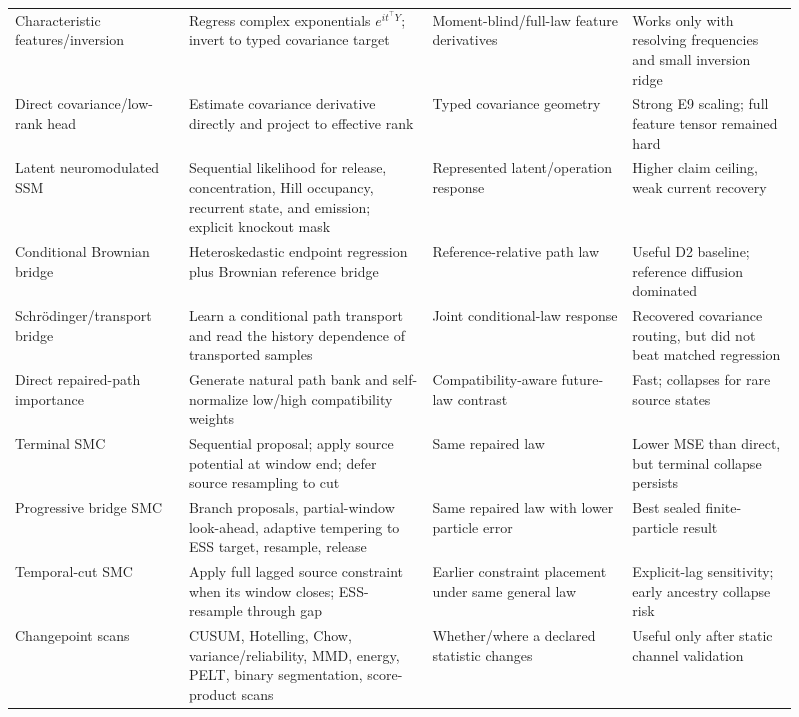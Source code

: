 \documentclass[10pt]{article}
\begin{document}
\begin{longtable}{L{0.20\linewidth}L{0.29\linewidth}L{0.23\linewidth}L{0.19\linewidth}}
Characteristic features/inversion & Regress complex exponentials $e^{it^\top Y}$; invert to typed covariance target & Moment-blind/full-law feature derivatives & Works only with resolving frequencies and small inversion ridge \\
Direct covariance/low-rank head & Estimate covariance derivative directly and project to effective rank & Typed covariance geometry & Strong E9 scaling; full feature tensor remained hard \\
Latent neuromodulated SSM & Sequential likelihood for release, concentration, Hill occupancy, recurrent state, and emission; explicit knockout mask & Represented latent/operation response & Higher claim ceiling, weak current recovery \\
Conditional Brownian bridge & Heteroskedastic endpoint regression plus Brownian reference bridge & Reference-relative path law & Useful D2 baseline; reference diffusion dominated \\
Schr\"odinger/transport bridge & Learn a conditional path transport and read the history dependence of transported samples & Joint conditional-law response & Recovered covariance routing, but did not beat matched regression \\
Direct repaired-path importance & Generate natural path bank and self-normalize low/high compatibility weights & Compatibility-aware future-law contrast & Fast; collapses for rare source states \\
Terminal SMC & Sequential proposal; apply source potential at window end; defer source resampling to cut & Same repaired law & Lower MSE than direct, but terminal collapse persists \\
Progressive bridge SMC & Branch proposals, partial-window look-ahead, adaptive tempering to ESS target, resample, release & Same repaired law with lower particle error & Best sealed finite-particle result \\
Temporal-cut SMC & Apply full lagged source constraint when its window closes; ESS-resample through gap & Earlier constraint placement under same general law & Explicit-lag sensitivity; early ancestry collapse risk \\
Changepoint scans & CUSUM, Hotelling, Chow, variance/reliability, MMD, energy, PELT, binary segmentation, score-product scans & Whether/where a declared statistic changes & Useful only after static channel validation \\
\bottomrule
\end{longtable}
\end{document}

